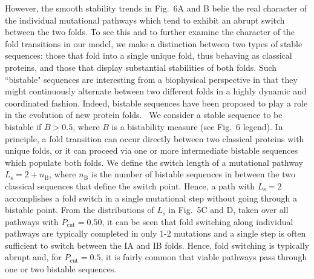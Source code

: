 \documentclass[
aip,
rsi,%
amsmath,amssymb,
reprint,%
]{revtex4-1}
\newcommand {\Pcut}     	{{P_\mathrm{cut}}}
\begin{document}

However, the smooth stability trends in Fig.~6A and B belie the real character of the individual mutational pathways which tend to exhibit an abrupt switch between the two folds. To see this and to further examine the character of the fold transitions in our model, we make a distinction between two types of stable sequences: those that fold into a single unique fold, thus behaving as classical proteins, and those that display substantial stabilities of both folds. Such ``bistable" sequences are interesting from a biophysical perspective in that they might continuously alternate between two different folds in a highly dynamic and coordinated fashion. Indeed, bistable sequences have been proposed to play a role in the evolution of new protein folds.~\cite{Sikosek2012} We consider a stable sequence to be bistable if $B>0.5$, where $B$ is a bistability measure (see Fig.~6 legend). In principle, a fold transition can occur directly between two classical proteins with unique folds, or it can proceed via one or more intermediate bistable sequences which populate both folds. We define the switch length of a mutational pathway $L_\mathrm{s}=2+n_\mathrm{B}$, where $n_\mathrm{B}$ is the number of bistable sequences in between the two classical sequences that define the switch point. Hence, a path with $L_\mathrm{s}=2$ accomplishes a fold switch in a single mutational step without going through a bistable point. From the distributions of  $L_\mathrm{s}$ in Fig.~5C and D, taken over all pathways with $\Pcut=0.50$, it can be seen that fold switching along individual pathways are typically completed in only 1-2 mutations and a single step is often sufficient to switch between the IA and IB folds. Hence, fold switching is typically abrupt and, for $\Pcut = 0.5$, it is fairly common that viable pathways pass through one or two bistable sequences. 
\end{document}
